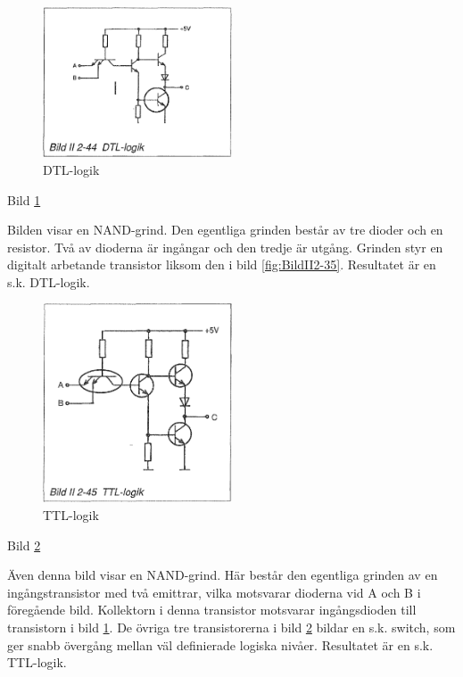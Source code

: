 \begin{figure}
\includegraphics[width=0.5\textwidth]{images/bild_2_2-44}
\caption{DTL-logik}
\label{fig:BildII2-44}
\end{figure}

Bild \ref{fig:BildII2-44}

Bilden visar en NAND-grind. Den egentliga grinden består av tre dioder och en
resistor. Två av dioderna är ingångar och den tredje är utgång. Grinden styr en
digitalt arbetande transistor liksom den i bild \ref{fig:BildII2-35}.
Resultatet är en s.k. DTL-logik.

\begin{figure}
\includegraphics[width=0.5\textwidth]{images/bild_2_2-45}
\caption{TTL-logik}
\label{fig:BildII2-45}
\end{figure}

Bild \ref{fig:BildII2-45}

Även denna bild visar en NAND-grind. Här består den egentliga grinden av en
ingångstransistor med två emittrar, vilka motsvarar dioderna vid A och B i
föregående bild. Kollektorn i denna transistor motsvarar ingångsdioden till
transistorn i bild \ref{fig:BildII2-44}. De övriga tre transistorerna i bild
\ref{fig:BildII2-45} bildar en s.k. switch, som ger snabb övergång mellan väl
definierade logiska nivåer. Resultatet är en s.k. TTL-logik.
